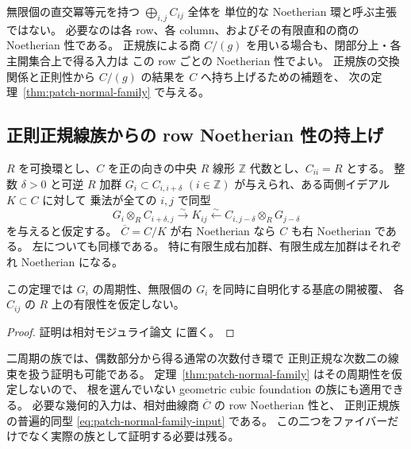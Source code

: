 \begin{remark}
無限個の直交冪等元を持つ $\bigoplus_{i,j}C_{ij}$ 全体を
単位的な Noetherian 環と呼ぶ主張ではない。
必要なのは各 row、各 column、およびその有限直和の商の Noetherian 性である。
正規族による商 $C/(g)$ を用いる場合も、閉部分上・各主開集合上で得る入力は
この row ごとの Noetherian 性でよい。
正規族の交換関係と正則性から $C/(g)$ の結果を $C$ へ持ち上げるための補題を、
次の定理~\ref{thm:patch-normal-family} で与える。
\end{remark}

\subsection{正則正規線族からの row Noetherian 性の持上げ}

\begin{theorem}
\label{thm:patch-normal-family}
$R$ を可換環とし、$C$ を正の向きの中央 $R$ 線形 $\mathbb Z$ 代数とし、$C_{ii}=R$ とする。
整数 $\delta>0$ と可逆 $R$ 加群
$G_i\subset C_{i,i+\delta}$ $(i\in\mathbb Z)$ が与えられ、ある両側イデアル $K\subset C$ に対して
乗法が全ての $i,j$ で同型
\begin{equation}\label{eq:patch-normal-family-input}
 G_i\otimes_R C_{i+\delta,j}
       \xrightarrow{\sim}K_{ij}
       \xleftarrow{\sim}C_{i,j-\delta}\otimes_R G_{j-\delta}
\end{equation}
を与えると仮定する。
$\overline C=C/K$ が右 Noetherian なら $C$ も右 Noetherian である。
左についても同様である。
特に有限生成右加群、有限生成左加群はそれぞれ Noetherian になる。

この定理では $G_i$ の周期性、無限個の $G_i$ を同時に自明化する基底の開被覆、
各 $C_{ij}$ の $R$ 上の有限性を仮定しない。
\end{theorem}

\begin{proof}
証明は相対モジュライ論文 \cite[\texttt{relative_noetherian_patching}]{QuadricModuli2026} に置く。
\end{proof}

\begin{remark}[偶数環による証明との関係]
二周期の族では、偶数部分から得る通常の次数付き環で
正則正規な次数二の線束を扱う証明も可能である。
定理~\ref{thm:patch-normal-family} はその周期性を仮定しないので、
根を選んでいない geometric cubic foundation の族にも適用できる。
必要な幾何的入力は、相対曲線商 $\overline C$ の row Noetherian 性と、
正則正規族の普遍的同型 \eqref{eq:patch-normal-family-input} である。
この二つをファイバーだけでなく実際の族として証明する必要は残る。
\end{remark}

